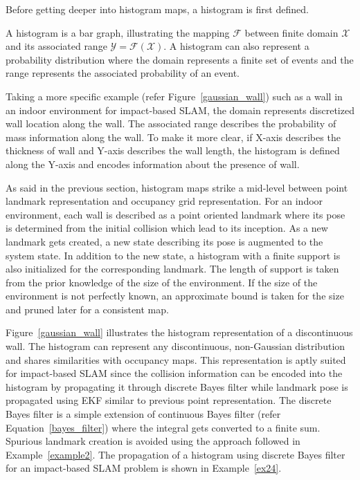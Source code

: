Before getting deeper into histogram maps, a histogram is first defined.
\begin{defn} A histogram is a bar graph, illustrating the mapping $\mathcal{F}$ between finite domain $\mathcal{X}$ and its associated range $\mathcal{Y}=\mathcal{F}(\mathcal{X})$. A histogram can also represent a probability distribution where the domain represents a finite set of events and the range represents the associated probability of an event.
\end{defn}
Taking a more specific example (refer Figure~\ref{gaussian_wall}) such as a wall in an indoor environment for impact-based SLAM, the domain represents discretized wall location along the wall. The associated range describes the probability of mass information along the wall. To make it more clear, if X-axis describes the thickness of wall and Y-axis describes the wall length, the histogram is defined along the Y-axis and encodes information about the presence of wall. 

As said in the previous section, histogram maps strike a mid-level between point landmark representation and occupancy grid representation. For an indoor environment, each wall is described as a point oriented landmark where its pose is determined from the initial collision which lead to its inception. As a new landmark gets created, a new state describing its pose is augmented to the system state. In addition to the new state, a histogram with a finite support is also initialized for the corresponding landmark. The length of support is taken from the prior knowledge of the size of the environment. If the size of the environment is not perfectly known, an approximate bound is taken for the size and pruned later for a consistent map. 

Figure~\ref{gaussian_wall} illustrates the histogram representation of a discontinuous wall. The histogram can represent any discontinuous, non-Gaussian distribution and shares similarities with occupancy maps. This representation is aptly suited for impact-based SLAM since the collision information can be encoded into the histogram by propagating it through discrete Bayes filter while landmark pose is propagated using EKF similar to previous point representation. The discrete Bayes filter is a simple extension of continuous Bayes filter (refer Equation~\ref{bayes_filter}) where the integral gets converted to a finite sum. Spurious landmark creation is avoided using the approach followed in Example~\ref{example2}. The propagation of a histogram using discrete Bayes filter for an impact-based SLAM problem is shown in Example~\ref{ex24}.

